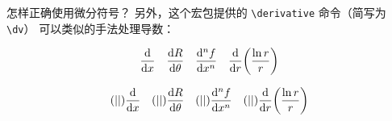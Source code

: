 \begin{myQA}{怎样正确使用微分符号？}
	另外，这个宏包提供的 \verb|\derivative| 命令（简写为 \verb|\dv|）
	可以类似的手法处理导数：
\begin{myExampleH}
{
\begin{equation*}
\dv{x} \quad \dv{R}{\theta} \quad \dv[n]{f}{x} \quad
\dv{r}(\frac{\ln r}{r})
\end{equation*}
}
\usepackage{physics}
\begin{equation*}
(|{ {} {} {} }|)\dv{x} \quad
(|{ {} {} {} }|)\dv{R}{\theta} \quad
(|{ {} {} {} }|)\dv[n]{f}{x} \quad
(|{ {} {} {} }|)\dv{r}(\frac{\ln r}{r})
\end{equation*}
\end{myExampleH}
	
\end{myQA}
